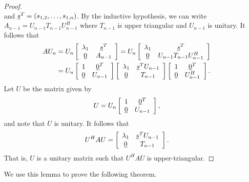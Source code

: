 \begin{proof}
\begin{equation*}
\end{equation*}
and $\underline{s}^T = (s_{1,2}, \ldots, s_{1,n})$.
By the inductive hypothesis, we can write $A_{n-1} = U_{n-1} T_{n-1} U_{n-1}^H$ where $T_{n-1}$ is upper triangular and $U_{n-1}$ is unitary.
It follows that
\begin{equation*}
\begin{split}
A U_n &= U_n \left[ \begin{array}{cc} \lambda_1 & \underline{s}^T \\
\underline{0} & A_{n-1} \end{array} \right]
= U_n \left[ \begin{array}{cc} \lambda_1 & \underline{s}^T \\
\underline{0} & U_{n-1} T_{n-1} U_{n-1}^H \end{array} \right] \\
&= U_n \left[ \begin{array}{cc} 1 & \underline{0}^T \\
\underline{0} & U_{n-1} \end{array} \right]
\left[ \begin{array}{cc} \lambda_1 & \underline{s}^T U_{n-1} \\
\underline{0} & T_{n-1} \end{array} \right]
\left[ \begin{array}{cc} 1 & \underline{0}^T \\
\underline{0} & U_{n-1}^H \end{array} \right] .
\end{split}
\end{equation*}
Let $U$ be the matrix given by
\begin{equation*}
U = U_n \left[ \begin{array}{cc} 1 & \underline{0}^T \\
\underline{0} & U_{n-1} \end{array} \right] ,
\end{equation*}
and note that $U$ is unitary.
It follows that
\begin{equation*}
U^H A U = 
\left[ \begin{array}{cc} \lambda_1 & \underline{s}^T U_{n-1} \\
\underline{0} & T_{n-1} \end{array} \right] .
\end{equation*}
That is, $U$ is a unitary matrix such that $U^H A U$ is upper-triangular.
\end{proof}

We use this lemma to prove the following theorem.

